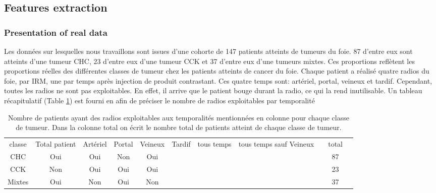 \documentclass[10pt]{article}
\begin{document}
\subsection{Features extraction}

\subsubsection{Presentation of real data}

Les données sur lesquelles nous travaillons sont issues d'une cohorte de 147 patients atteints de tumeurs du foie. 87 d'entre eux sont atteints d'une tumeur CHC, 23 d'entre eux d'une tumeur CCK et 37 d'entre eux d'une tumeurs mixtes. Ces proportions reflètent les proportions réelles des différentes classes de tumeur chez les patients atteints de cancer du foie. Chaque patient a réalisé quatre radios du foie, par IRM, une par temps après injection de produit contrastant. Ces quatre temps sont: artériel, portal, veineux et tardif. Cependant, toutes les radios ne sont pas exploitables. En effet, il arrive que le patient bouge durant la radio, ce qui la rend inutilisable. Un tableau récapitulatif (Table \ref{tab:nb_tumeurs}) est fourni en afin de préciser le nombre de radios exploitables par temporalité 

\begin{table}[tbp]
    \centering
    \caption{Nombre de patients ayant des radios exploitables aux temporalités mentionnées en colonne pour chaque classe de tumeur. Dans la colonne total on écrit le nombre total de patients atteint de chaque classe de tumeur.}
    \label{tab:nb_tumeurs}
    \begin{tabular}{|c|c|c|c|c|c|c|c|c|c|c|}
        \cline{1-8} \cline{10-10}
        classe & Total patient & Artériel & Portal & Veineux & Tardif & tous temps & tous temps sauf Veineux & & total \\
        \cline{1-8} \cline{10-10}
        CHC & Oui & Oui & Non & Oui & & & & & 87\\
        \cline{1-8} \cline{10-10}
        CCK & Non & Oui & Oui & Oui & & & & & 23\\
        \cline{1-8} \cline{10-10}
        Mixtes & Oui & Non & Oui & Non & & & & & 37\\
        \cline{1-8} \cline{10-10}
    \end{tabular}
\end{table}
\end{document}
